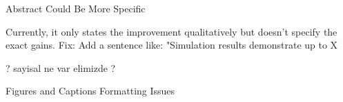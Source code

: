 Abstract Could Be More Specific

Currently, it only states the improvement qualitatively but doesn’t specify the exact gains.
Fix: Add a sentence like:
"Simulation results demonstrate up to X%

? sayisal ne var elimizde ?

Figures and Captions Formatting Issues



